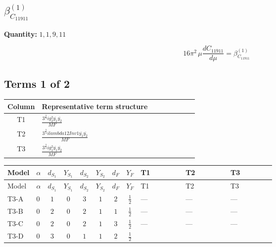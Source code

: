 \documentclass[8pt]{article}
\begin{document}
\begin{landscape}
\section*{$\beta_{C_{11911}}^{(1)}$}
\noindent\textbf{Quantity: }$\mathrm{1,1,9,11}$\par\smallskip
\[16\pi^2\,\mu\frac{d C_{11911}}{d\mu}=\beta_{C_{11911}}^{(1)}\]
\subsection*{Terms 1 of 2}
\begin{center}
\begin{tabular}{@{}c >{\raggedright\arraybackslash}p{0.82\linewidth}@{}}
\toprule
Column & Representative term structure \\
\midrule
T1 & \(\displaystyle \frac{3^{\frac{3}{4}} i g_{2}^{2} \overline{y_{1}} \overline{y_{2}}}{MF}\) \\
\midrule
T2 & \(\displaystyle \frac{3^{\frac{3}{4}} i lambda12Inv1 \overline{y_{1}} \overline{y_{2}}}{MF}\) \\
\midrule
T3 & \(\displaystyle \frac{3^{\frac{3}{4}} i g_{1}^{2} \overline{y_{1}} \overline{y_{2}}}{MF}\) \\
\midrule
\bottomrule
\end{tabular}
\end{center}
\smallskip
\tiny
\begin{longtable}{@{}llcccccc >{\raggedright\arraybackslash}p{0.21\linewidth} >{\raggedright\arraybackslash}p{0.21\linewidth} >{\raggedright\arraybackslash}p{0.21\linewidth}@{}}
\toprule
Model & $\alpha$ & $d_{S_1}$ & $Y_{S_1}$ & $d_{S_2}$ & $Y_{S_2}$ & $d_F$ & $Y_F$ & T1 & T2 & T3 \\
\midrule
\endfirsthead
\toprule
Model & $\alpha$ & $d_{S_1}$ & $Y_{S_1}$ & $d_{S_2}$ & $Y_{S_2}$ & $d_F$ & $Y_F$ & T1 & T2 & T3 \\
\midrule
\endhead
T3-A & $0$ & $1$ & $0$ & $3$ & $1$ & $2$ & $\frac{1}{2}$ & --- & --- & --- \\
\midrule
T3-B & $0$ & $2$ & $0$ & $2$ & $1$ & $1$ & $\frac{1}{2}$ & --- & --- & --- \\
\midrule
T3-C & $0$ & $2$ & $0$ & $2$ & $1$ & $3$ & $\frac{1}{2}$ & --- & --- & --- \\
\midrule
T3-D & $0$ & $3$ & $0$ & $1$ & $1$ & $2$ & $\frac{1}{2}$ & \scriptsize\adjustbox{max width=\linewidth}{$\begin{gathered} - \frac{11 \cdot 3^{\frac{3}{4}} i g_{2}^{2} \overline{y_{1}} \overline{y_{2}}}{8 MF}\end{gathered}$} & \scriptsize\adjustbox{max width=\linewidth}{$\begin{gathered} - \frac{3^{\frac{3}{4}} i lambda12Inv1 \overline{y_{1}} \overline{y_{2}}}{6 MF}\end{gathered}$} & \scriptsize\adjustbox{max width=\linewidth}{$\begin{gathered} - \frac{3^{\frac{3}{4}} i g_{1}^{2} \overline{y_{1}} \overline{y_{2}}}{8 MF}\end{gathered}$} \\

\end{longtable}
\end{landscape}
\end{document}
